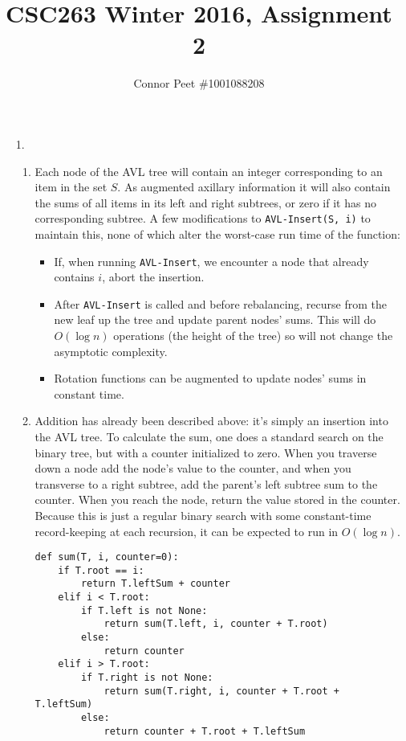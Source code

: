 \documentclass{article}
\title{CSC263 Winter 2016, Assignment 2}
\author{Connor Peet \#1001088208}
\begin{document}
\maketitle

\lstset{
    numbers=left
}

\begin{enumerate}
\item [1.]
    \begin{enumerate}
    \item Each node of the AVL tree will contain an integer corresponding to an item in the set $S$. As augmented axillary information it will also contain the sums of all items in its left and right subtrees, or zero if it has no corresponding subtree. A few modifications to \texttt{AVL-Insert(S, i)} to maintain this, none of which alter the worst-case run time of the function:
        \begin{itemize}
        \item If, when running \texttt{AVL-Insert}, we encounter a node that already contains $i$, abort the insertion.
        \item After \texttt{AVL-Insert} is called and before rebalancing, recurse from the new leaf up the tree and update parent nodes' sums. This will do $O(\log n)$ operations (the height of the tree) so will not change the asymptotic complexity.
        \item Rotation functions can be augmented to update nodes' sums in constant time.
        \end{itemize}
    \item Addition has already been described above: it's simply an insertion into the AVL tree. To calculate the sum, one does a standard search on the binary tree, but with a counter initialized to zero. When you traverse down a node add the node's value to the counter, and when you transverse to a right subtree, add the parent's left subtree sum to the counter. When you reach the node, return the value stored in the counter. Because this is just a regular binary search with some constant-time record-keeping at each recursion, it can be expected to run in $O(\log n)$.

\begin{lstlisting}
def sum(T, i, counter=0):
    if T.root == i:
        return T.leftSum + counter
    elif i < T.root:
        if T.left is not None:
            return sum(T.left, i, counter + T.root)
        else:
            return counter
    elif i > T.root:
        if T.right is not None:
            return sum(T.right, i, counter + T.root + T.leftSum)
        else:
            return counter + T.root + T.leftSum
\end{lstlisting}
    \end{enumerate}


\end{enumerate}
\end{document}
